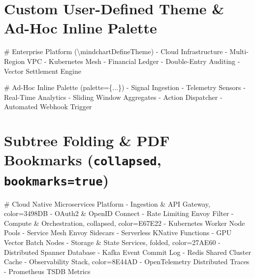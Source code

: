 \documentclass{article}
\begin{document}
\vspace{0.8cm}

\section*{Custom User-Defined Theme \& Ad-Hoc Inline Palette}


\begin{mindchart}[theme=brandtheme, layout=right, style=classic, line=tapered, scale=0.68]
# Enterprise Platform (\textbackslash mindchartDefineTheme)
  - Cloud Infrastructure
    - Multi-Region VPC
    - Kubernetes Mesh
  - Financial Ledger
    - Double-Entry Auditing
    - Vector Settlement Engine
\end{mindchart}

\vspace{0.8cm}

\begin{mindchart}[palette={E63946, F77F00, FCBF49, 0077B6}, layout=right, style=boxed, line=elbow, scale=0.68]
# Ad-Hoc Inline Palette (palette=\{...\})
  - Signal Ingestion
    - Telemetry Sensors
  - Real-Time Analytics
    - Sliding Window Aggregates
  - Action Dispatcher
    - Automated Webhook Trigger
\end{mindchart}

\newpage

\section*{Subtree Folding \& PDF Bookmarks (\texttt{collapsed}, \texttt{bookmarks=true})}

\begin{mindchart}[theme=rainbow, layout=right, style=classic, line=tapered, bookmarks=true, scale=0.68]
# Cloud Native Microservices Platform
  - Ingestion \& API Gateway, color=3498DB
    - OAuth2 \& OpenID Connect
    - Rate Limiting Envoy Filter
  - Compute \& Orchestration, collapsed, color=E67E22
    - Kubernetes Worker Node Pools
    - Service Mesh Envoy Sidecars
    - Serverless KNative Functions
    - GPU Vector Batch Nodes
  - Storage \& State Services, folded, color=27AE60
    - Distributed Spanner Database
    - Kafka Event Commit Log
    - Redis Shared Cluster Cache
  - Observability Stack, color=8E44AD
    - OpenTelemetry Distributed Traces
    - Prometheus TSDB Metrics
\end{mindchart}
\end{document}

